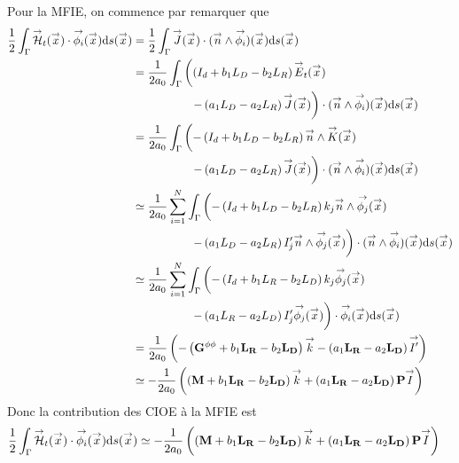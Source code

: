       Pour la MFIE, on commence par remarquer que
      \begin{equation}
        \begin{aligned}
          \frac{1}{2}\int_\Gamma \vH_t(\vx) \cdot \phii(\vx) \dd{s}(\vx)
          &= \frac{1}{2}\int_\Gamma \vJ(\vx) \cdot (\vn \pvect \phii)(\vx) \dd{s}(\vx)
          \\
          &= \frac{1}{2a_0}\int_\Gamma \left( \left(I_d + b_1 L_D - b_2 L_R\right) \vE_t (\vx) \right.
          \\
          & \hspace{5em} \left.- \left(a_1 L_D - a_2 L_R\right) \vJ (\vx) \right) \cdot (\vn \pvect \phii)(\vx) \dd{s}(\vx)
          \\
          &= \frac{1}{2a_0}\int_\Gamma \left( -\left(I_d + b_1 L_D - b_2 L_R\right) \vn \pvect \vK (\vx) \right.
          \\
          & \hspace{5em} \left.- \left(a_1 L_D - a_2 L_R\right) \vJ (\vx) \right) \cdot (\vn \pvect \phii)(\vx) \dd{s}(\vx)
          \\
          & \simeq \frac{1}{2a_0}\sum_{i=1}^N \int_\Gamma \left( -\left(I_d + b_1 L_D - b_2 L_R\right) k_j \vn \pvect   \phij (\vx) \right.
          \\
          & \hspace{5em} \left. - \left(a_1 L_D - a_2 L_R\right) I_j' \vn \pvect \phij (\vx) \right) \cdot (\vn \pvect \phii)(\vx) \dd{s}(\vx)
          \\
          & \simeq \frac{1}{2a_0}\sum_{i=1}^N \int_\Gamma \left( -\left(I_d + b_1 L_R - b_2 L_D\right) k_j \phij (\vx) \right.
          \\
          & \hspace{5em} \left. - \left(a_1 L_R - a_2 L_D\right) I_j' \phij (\vx) \right) \cdot \phii(\vx) \dd{s}(\vx)
          \\
          & = \frac{1}{2a_0} \left( -\left(\mG{\phi}{\phi} + b_1 \mLR - b_2 \mLD\right) \vect{k}  - \left( a_1 \mLR - a_2 \mLD\right) \vect{I'}\right)
          \\
          & \simeq -\frac{1}{2a_0} \left( \left(\mM + b_1 \mLR - b_2 \mLD\right) \vect{k}  + \left( a_1 \mLR - a_2 \mLD\right) \mPP \vect{I} \right)
        \end{aligned}
      \end{equation}
      Donc la contribution des CIOE à la MFIE est
      \begin{equation}
        \begin{aligned}
          \frac{1}{2}\int_\Gamma \vH_t(\vx) \cdot \phii(\vx) \dd{s}(\vx)
          &\simeq -\frac{1}{2a_0} \left( \left(\mM + b_1 \mLR - b_2 \mLD\right) \vect{k}  + \left( a_1 \mLR - a_2 \mLD\right) \mPP \vect{I} \right)
        \end{aligned}
      \end{equation}

